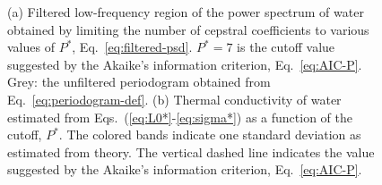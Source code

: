 \begin{figure}
    \centering
    \begin{center}
    \end{center}
    \caption{
    (a) Filtered low-frequency region of the power spectrum of water obtained by limiting the number of cepstral coefficients to various values of $P^*$, Eq.~\eqref{eq:filtered-psd}. $P^*=7$ is the cutoff value suggested by the Akaike's information criterion, Eq.~\eqref{eq:AIC-P}. Grey: the unfiltered periodogram obtained from Eq.~\eqref{eq:periodogram-def}.
    (b) Thermal conductivity of water estimated from Eqs.~(\ref{eq:L0*}-\ref{eq:sigma*}) as a function of the cutoff, $P^*$. The colored bands indicate one standard deviation as estimated from theory. The vertical dashed line indicates the value suggested by the Akaike's information criterion, Eq.~\eqref{eq:AIC-P}.
    }
\end{figure}


